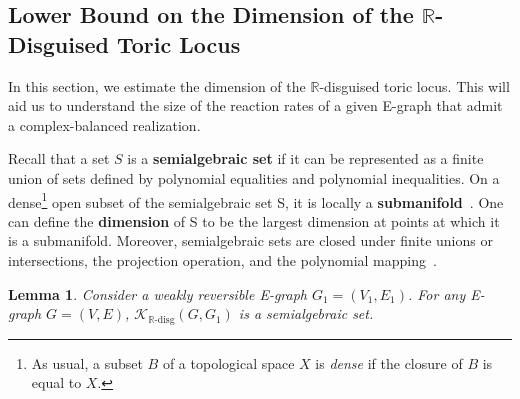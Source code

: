 \documentclass[11pt]{article}
\theoremstyle{plain}
\newtheorem{lemma}[theorem]{Lemma}
\theoremstyle{definition}
\theoremstyle{remark}
\newcommand\RR{\mathbb{R}}
\newcommand{\dK}{\mathcal{K}_{\RR\text{-disg}}}
\begin{document}
\subsection{Lower Bound on the Dimension of the \texorpdfstring{$\RR$}{R}-Disguised Toric Locus}
\label{sec:lower_bound}

In this section, we estimate the dimension of the $\RR$-disguised toric locus. This will aid us to understand the size of the reaction rates of a given E-graph that admit a complex-balanced realization.

\medskip

Recall that a set $S$ is a \textbf{semialgebraic set} if it can be represented as a finite union of sets defined by polynomial equalities and polynomial inequalities. On a dense\footnote{As  usual, a subset $B$ of a topological space $X$ is {\em dense} if the closure of $B$ is equal to $X$.} open subset of the semialgebraic set S, it is locally a \textbf{submanifold}~\cite{lee2010introduction}. One can define the \textbf{dimension} of S to be the largest dimension at points at which it is a submanifold. Moreover, semialgebraic sets are closed under finite unions or intersections, the projection operation, and the polynomial mapping~\cite{bierstone1988semianalytic}.

\begin{lemma}
\label{lem:semi_algebaic}
Consider a weakly reversible E-graph $G_1 = (V_1, E_1)$. For any E-graph $G = (V, E)$, $\dK(G,G_1)$ is a semialgebraic set.
\end{lemma} 
\end{document}
